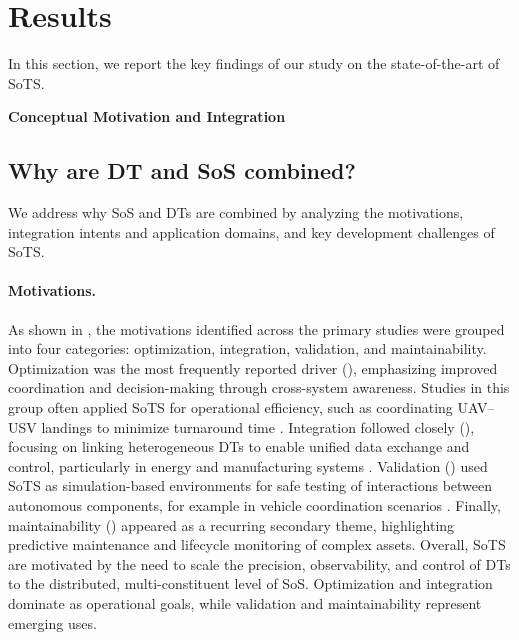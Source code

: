 

\section{Results}\label{sec:literature-review-results}
In this section, we report the key findings of our study on the state-of-the-art of SoTS.

\vspace{0.5em}
\noindent \textbf{\large Conceptual Motivation and Integration}
\vspace{-1em}



\subsection{Why are DT and SoS combined?}\label{subsec:literature-review-results-rq1}
We address why SoS and DTs are combined by analyzing the motivations, integration intents and application domains, and key development challenges of SoTS.


\paragraph{Motivations.}\label{para:lt-rq1-motivations}
As shown in , the motivations identified across the primary studies were grouped into four categories: optimization, integration, validation, and maintainability. Optimization was the most frequently reported driver (), emphasizing improved coordination and decision-making through cross-system awareness. Studies in this group often applied SoTS for operational efficiency, such as coordinating UAV–USV landings to minimize turnaround time \cite{li2022cognitive}. Integration followed closely (), focusing on linking heterogeneous DTs to enable unified data exchange and control, particularly in energy and manufacturing systems \cite{monsalve2021novel}. Validation () used SoTS as simulation-based environments for safe testing of interactions between autonomous components, for example in vehicle coordination scenarios \cite{dahmen2022modeling}. Finally, maintainability () appeared as a recurring secondary theme, highlighting predictive maintenance and lifecycle monitoring of complex assets. Overall, SoTS are motivated by the need to scale the precision, observability, and control of DTs to the distributed, multi-constituent level of SoS. Optimization and integration dominate as operational goals, while validation and maintainability represent emerging uses.



